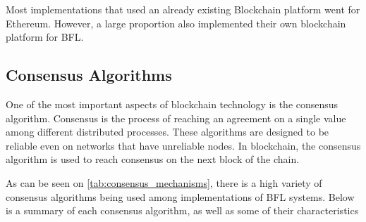 

 Most implementations that used an already existing Blockchain platform went for Ethereum. However, a large proportion also implemented their own blockchain platform for BFL.

\subsection{Consensus Algorithms}

One of the most important aspects of blockchain technology is the consensus algorithm. Consensus is the process of reaching an agreement on a single value among different distributed processes. These algorithms are designed to be reliable even on networks that have unreliable nodes. In blockchain, the consensus algorithm is used to reach consensus on the next block of the chain.



As can be seen on \autoref{tab:consensus_mechanisms}, there is a high variety of consensus algorithms being used among implementations of BFL systems. Below is a summary of each consensus algorithm, as well as some of their characteristics

